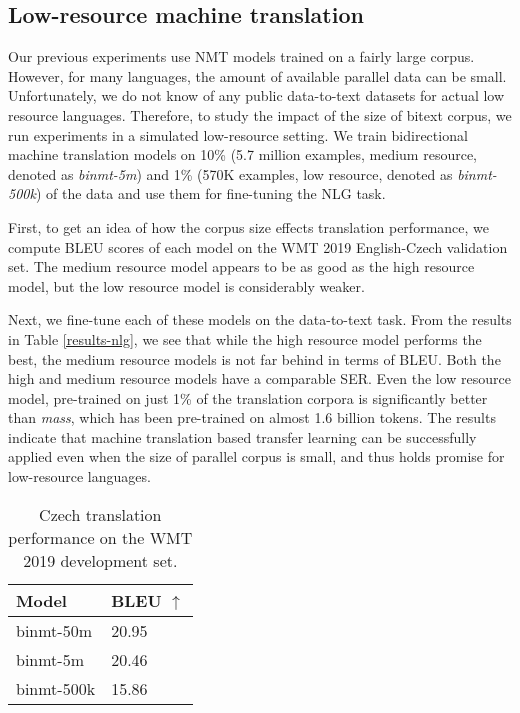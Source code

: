 \documentclass[11pt,a4paper]{article}
\begin{document}
\subsection{Low-resource machine translation} \label{low-nmt}
Our previous experiments use NMT models trained on a fairly large corpus. However, for many languages, the amount of available parallel data can be small. Unfortunately, we do not know of any public data-to-text datasets for actual low resource languages. Therefore, to study the impact of the size of bitext corpus, we run experiments in a simulated low-resource setting. We train bidirectional machine translation models on 10\% (5.7 million examples, medium resource, denoted as \textsl{binmt-5m}) and 1\% (570K examples, low resource, denoted as \textsl{binmt-500k}) of the data and use them for fine-tuning the NLG task.  \par
First, to get an idea of how the corpus size effects translation performance, we compute BLEU  scores of each model on the WMT 2019 English-Czech validation set. The medium resource model appears to be as good as the high resource model, but the low resource model is considerably weaker. \par
Next, we fine-tune each of these models on the data-to-text task. From the results in Table \ref{results-nlg}, we see that while the high resource model performs the best, the medium resource models is not far behind in terms of BLEU. Both the high and medium resource models have a comparable SER. Even the low resource model, pre-trained on just 1\% of the translation corpora is significantly better than \textsl{mass}, which has been pre-trained on almost 1.6 billion tokens. The results indicate that machine translation based transfer learning can be successfully applied even when the size of parallel corpus is small, and thus holds promise for low-resource languages.



\begin{table}[]
\centering
\begin{tabular}{l|l}
\hline
Model & BLEU $\uparrow$     \\ \hline
binmt-50m             & 20.95    \\
binmt-5m             & 20.46  \\
binmt-500k             & 15.86 \\ 
\hline

\end{tabular}
\caption{Czech translation performance on the WMT 2019 development set.}
\label{results-nmt}
\end{table}
\end{document}
